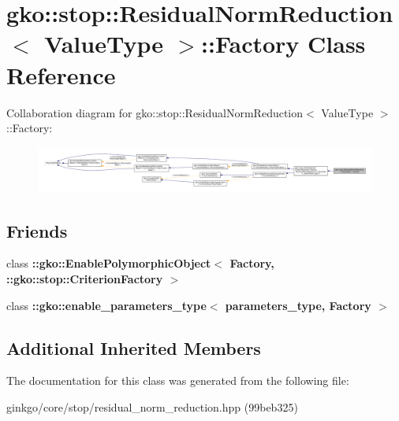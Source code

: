 \hypertarget{classgko_1_1stop_1_1ResidualNormReduction_1_1Factory}{}\section{gko\+:\+:stop\+:\+:Residual\+Norm\+Reduction$<$ Value\+Type $>$\+:\+:Factory Class Reference}
\label{classgko_1_1stop_1_1ResidualNormReduction_1_1Factory}


Collaboration diagram for gko\+:\+:stop\+:\+:Residual\+Norm\+Reduction$<$ Value\+Type $>$\+:\+:Factory\+:
\nopagebreak
\begin{figure}[H]
\begin{center}
\leavevmode
\includegraphics[width=350pt]{classgko_1_1stop_1_1ResidualNormReduction_1_1Factory__coll__graph}
\end{center}
\end{figure}
\subsection*{Friends}
\begin{DoxyCompactItemize}
\item 
\mbox{\label{classgko_1_1stop_1_1ResidualNormReduction_1_1Factory_aaa5507cf00e5361a77971746fefa42e6}} 
class {\bfseries \+::gko\+::\+Enable\+Polymorphic\+Object$<$ Factory, \+::gko\+::stop\+::\+Criterion\+Factory $>$}
\item 
\mbox{\label{classgko_1_1stop_1_1ResidualNormReduction_1_1Factory_a0d176cbd42d6214e11aee8c30ca256fc}} 
class {\bfseries \+::gko\+::enable\+\_\+parameters\+\_\+type$<$ parameters\+\_\+type, Factory $>$}
\end{DoxyCompactItemize}
\subsection*{Additional Inherited Members}


The documentation for this class was generated from the following file\+:\begin{DoxyCompactItemize}
\item 
ginkgo/core/stop/residual\+\_\+norm\+\_\+reduction.\+hpp (99beb325)\end{DoxyCompactItemize}
